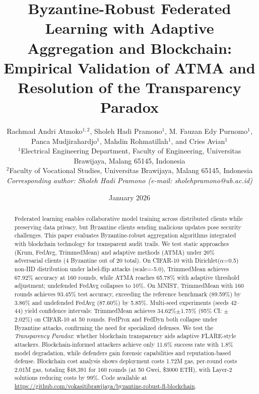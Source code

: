 \documentclass[12pt,a4paper,onecolumn]{article}
\begin{document}
\title{\textbf{Byzantine-Robust Federated Learning with Adaptive Aggregation and Blockchain: Empirical Validation of ATMA and Resolution of the Transparency Paradox}}

\author{
Rachmad Andri Atmoko$^{1,2}$,
Sholeh Hadi Pramono$^{1}$,
M. Fauzan Edy Purnomo$^{1}$,
Panca Mudjirahardjo$^{1}$,
Mahdin Rohmatillah$^{1}$, and
Cries Avian$^{1}$\\[10pt]
$^{1}$Electrical Engineering Department, Faculty of Engineering, Universitas Brawijaya, Malang 65145, Indonesia\\
$^{2}$Faculty of Vocational Studies, Universitas Brawijaya, Malang 65145, Indonesia\\[5pt]
\textit{Corresponding author: Sholeh Hadi Pramono (e-mail: sholehpramono@ub.ac.id)}
}

\date{January 2026}

\maketitle

\begin{abstract}
Federated learning enables collaborative model training across distributed clients while preserving data privacy, but Byzantine clients sending malicious updates pose security challenges. This paper evaluates Byzantine-robust aggregation algorithms integrated with blockchain technology for transparent audit trails. We test static approaches (Krum, FedAvg, TrimmedMean) and adaptive methods (ATMA) under 20\% adversarial clients (4 Byzantine out of 20 total). On CIFAR-10 with Dirichlet($\alpha$=0.5) non-IID distribution under label-flip attacks (scale=-5.0), TrimmedMean achieves 67.92\% accuracy at 160 rounds, while ATMA reaches 65.78\% with adaptive threshold adjustment; undefended FedAvg collapses to 10\%. On MNIST, TrimmedMean with 160 rounds achieves 93.45\% test accuracy, exceeding the reference benchmark (89.59\%) by 3.86\% and undefended FedAvg (87.60\%) by 5.85\%. Multi-seed experiments (seeds 42--44) yield confidence intervals: TrimmedMean achieves 34.62\%$\pm$1.75\% (95\% CI: $\pm$2.02\%) on CIFAR-10 at 50 rounds. FedProx and FedDyn both collapse under Byzantine attacks, confirming the need for specialized defenses. We test the \emph{Transparency Paradox}: whether blockchain transparency aids adaptive FLARE-style attackers. Blockchain-informed attackers achieve only 11.6\% success rate with 1.8\% model degradation, while defenders gain forensic capabilities and reputation-based defense. Blockchain cost analysis shows deployment costs 1.72M gas, per-round costs 2.01M gas, totaling \$48,391 for 160 rounds (at 50 Gwei, \$3000 ETH), with Layer-2 solutions reducing costs by 99\%. Code available at \url{https://github.com/vokasitibrawijaya/byzantine-robust-fl-blockchain}.
\end{abstract}
\end{document}
